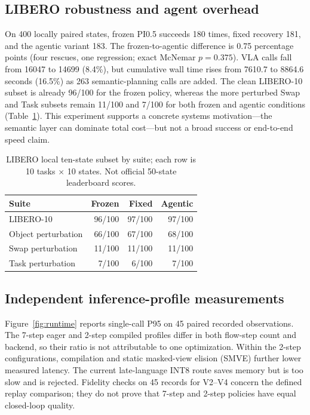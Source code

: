 \documentclass[letterpaper,10pt,conference]{ieeeconf}
\begin{document}
\subsection{LIBERO robustness and agent overhead}
On 400 locally paired states, frozen PI0.5 succeeds 180 times, fixed recovery 181, and the agentic variant 183. The frozen-to-agentic difference is 0.75 percentage points (four rescues, one regression; exact McNemar $p=0.375$). VLA calls fall from 16047 to 14699 (8.4\%), but cumulative wall time rises from 7610.7 to 8864.6 seconds (16.5\%) as 263 semantic-planning calls are added. The clean LIBERO-10 subset is already 96/100 for the frozen policy, whereas the more perturbed Swap and Task subsets remain 11/100 and 7/100 for both frozen and agentic conditions (Table~\ref{tab:libero}). This experiment supports a concrete systems motivation---the semantic layer can dominate total cost---but not a broad success or end-to-end speed claim.

\begin{table}[t]
\caption{LIBERO local ten-state subset by suite; each row is 10 tasks $\times$ 10 states. Not official 50-state leaderboard scores.}
\label{tab:libero}
\centering\footnotesize
\begin{tabular}{lrrr}
\toprule
Suite & Frozen & Fixed & Agentic\\
\midrule
LIBERO-10 & 96/100 & 97/100 & 97/100\\
Object perturbation & 66/100 & 67/100 & 68/100\\
Swap perturbation & 11/100 & 11/100 & 11/100\\
Task perturbation & 7/100 & 6/100 & 7/100\\
\bottomrule
\end{tabular}
\end{table}

\subsection{Independent inference-profile measurements}
Figure~\ref{fig:runtime} reports single-call P95 on 45 paired recorded observations. The 7-step eager and 2-step compiled profiles differ in both flow-step count and backend, so their ratio is not attributable to one optimization. Within the 2-step configurations, compilation and static masked-view elision (SMVE) further lower measured latency. The current late-language INT8 route saves memory but is too slow and is rejected. Fidelity checks on 45 records for V2--V4 concern the defined replay comparison; they do not prove that 7-step and 2-step policies have equal closed-loop quality.
\end{document}

